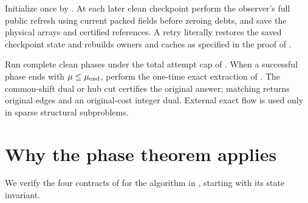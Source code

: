 \documentclass[11pt]{article}
\theoremstyle{remark}
\begin{document}
Initialize once by .
At each later clean checkpoint perform the observer's full public refresh using
current packed fields before zeroing debts, and save the physical arrays and
certified references.
A retry literally restores the saved checkpoint state and rebuilds owners and
caches as specified in the proof of .

Run complete clean phases under the total attempt cap of
.
When a successful phase ends with $\mu\le\mu_{\rm end}$, perform the one-time
exact extraction of .
The common-shift dual or hub cut certifies the original answer; matching returns
original edges and an original-cost integer dual.
External exact flow is used only in sparse structural subproblems.

\section{Why the phase theorem applies}
\label{sec:ram27-contract-closure}

We verify the four contracts of  for the algorithm in
, starting with its state invariant.
\end{document}
